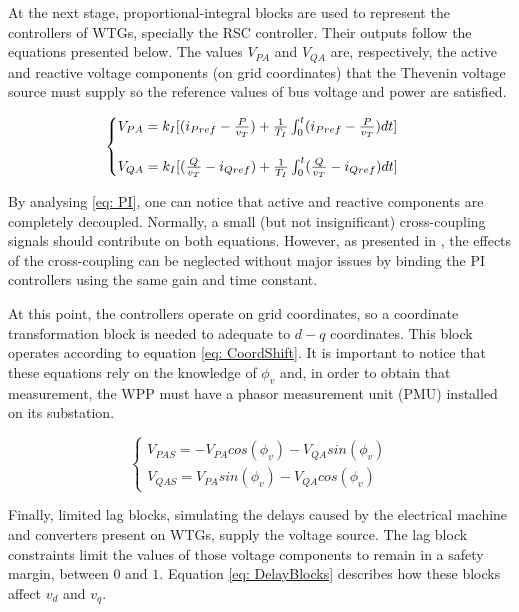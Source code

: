 At the next stage, proportional-integral blocks are used to represent the controllers of WTGs, specially the RSC controller. Their outputs follow the equations presented below. The values $V_{PA}$ and $V_{QA}$ are, respectively, the active and reactive voltage components (on grid coordinates) that the Thevenin voltage source must supply so the reference values of bus voltage and power are satisfied.

\begin{equation}
	\begin{cases}
		V_{PA} = k_{I}[(i_{Pref} - \frac{P}{v_{T}}) + \frac{1}{T_{I}}\int\displaylimits_{0}^{t} (i_{Pref} - \frac{P}{v_{T}})dt]\\
		\\
		V_{QA} = k_{I}[(\frac{Q}{v_{T}} - i_{Qref}) + \frac{1}{T_{I}}\int\displaylimits_{0}^{t} (\frac{Q}{v_{T}} - i_{Qref})dt]
	\end{cases}
	\label{eq: PI}
\end{equation}


By analysing \eqref{eq: PI}, one can notice that active and reactive components are completely decoupled. Normally, a small (but not insignificant) cross-coupling signals should contribute on both equations. However, as presented in \cite{Erlich2006}, the effects of the cross-coupling can be neglected without major issues by binding the PI controllers using the same gain and time constant.

At this point, the controllers operate on grid coordinates, so a coordinate transformation block is needed to adequate to $d-q$ coordinates. This block operates according to equation \eqref{eq: CoordShift}. It is important to notice that these equations rely on the knowledge of $\phi_{v}$ and, in order to obtain that measurement, the WPP must have a phasor measurement unit (PMU) installed on its substation.

\begin{equation}
	\begin{cases}
		V_{PAS} = -V_{PA}cos(\phi_{v}) - V_{QA}sin(\phi_{v}) \\
		V_{QAS} = V_{PA}sin(\phi_{v}) - V_{QA}cos(\phi_{v})
	\end{cases}
	\label{eq: CoordShift}
\end{equation}

Finally, limited lag blocks, simulating the delays caused by the electrical machine and converters present on WTGs, supply the voltage source. The lag block constraints limit the values of those voltage components to remain in a safety margin, between $0$ and $1$. Equation \eqref{eq: DelayBlocks} describes how these blocks affect $v_{d}$ and $v_{q}$.


